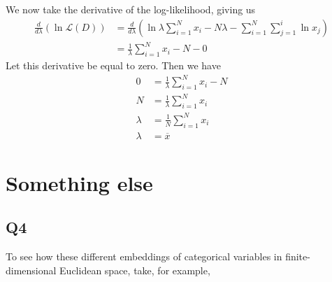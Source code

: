 \documentclass{article}
\theoremstyle{definition}
\begin{document}
        We now take the derivative of the log-likelihood, giving us 
        \begin{align*}
            \frac{d}{d\lambda}\left(
                \ln \mathcal{L}(D)
            \right) &= \frac{d}{d\lambda}\left(
                \ln \lambda \sum_{i = 1}^Nx_i - N\lambda - \sum_{i = 1}^N \sum_{j = 1}^i \ln x_j
            \right) \\
            &=\frac{1}{\lambda} \sum_{i=1}^N x_i - N - 0
        \end{align*}
        Let this derivative be equal to zero. Then we have 
        \begin{align*}
            0 &= \frac{1}{\lambda}\sum_{i=1}^N x_i - N \\
            N &= \frac{1}{\lambda} \sum_{i = 1}^N x_i \\
            \lambda &= \frac{1}{N} \sum_{i = 1}^N x_i \\
            \lambda &= \overline{x}
        \end{align*}
\section{Something else}
    \subsection{Q4}
    To see how these different embeddings of categorical variables in finite-dimensional Euclidean space,
    take, for example, 
\end{document}
